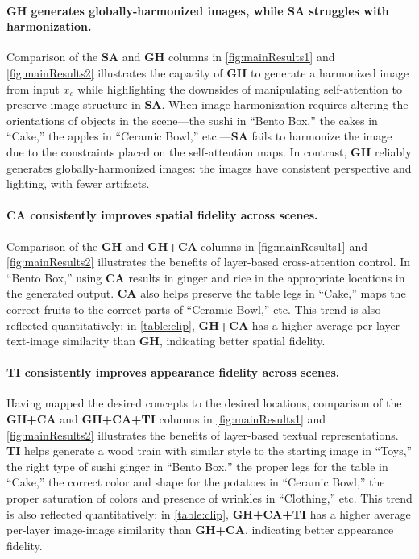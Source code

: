\paragraph{GH generates globally-harmonized images, while SA struggles with harmonization.}
Comparison of the \textbf{SA} and \textbf{GH} columns in \cref{fig:mainResults1} and \ref{fig:mainResults2} illustrates the capacity of \textbf{GH} to generate a harmonized image from input $x_c$ while highlighting the downsides of manipulating self-attention to preserve image structure in \textbf{SA}. When image harmonization requires altering the orientations of objects in the scene---the sushi in ``Bento Box,'' the cakes in ``Cake,'' the apples in ``Ceramic Bowl,'' etc.---\textbf{SA} fails to harmonize the image due to the constraints placed on the self-attention maps. In contrast, \textbf{GH} reliably generates globally-harmonized images: the images have consistent perspective and lighting, with fewer artifacts. 
\vspace{-1em}
\paragraph{CA consistently improves spatial fidelity across scenes.} 
Comparison of the \textbf{GH} and \textbf{GH+CA} columns in \cref{fig:mainResults1} and \ref{fig:mainResults2} illustrates the benefits of layer-based cross-attention control.
In ``Bento Box,'' using \textbf{CA} results in ginger and rice in the appropriate locations in the generated output. \textbf{CA} also helps preserve the table legs in ``Cake,'' maps the correct fruits to the correct parts of ``Ceramic Bowl,'' etc.
This trend is also reflected quantitatively: in \cref{table:clip}, \textbf{GH+CA} has a higher average per-layer text-image similarity than \textbf{GH}, indicating better spatial fidelity. 
\vspace{-1em}
\paragraph{TI consistently improves appearance fidelity across scenes.} Having mapped the desired concepts to the desired locations, comparison of the \textbf{GH+CA} and \textbf{GH+CA+TI} columns in \cref{fig:mainResults1} and \ref{fig:mainResults2} illustrates the benefits of layer-based textual representations. 
\textbf{TI} helps generate a wood train with similar style to the starting image in ``Toys,'' the right type of sushi ginger in ``Bento Box,'' the proper legs for the table in ``Cake,'' the correct color and shape for the potatoes in ``Ceramic Bowl,'' the proper saturation of colors and presence of wrinkles in ``Clothing,'' etc. 
This trend is also reflected quantitatively: in \cref{table:clip}, \textbf{GH+CA+TI} has a higher average per-layer image-image similarity than \textbf{GH+CA}, indicating better appearance fidelity. 
\vspace{-1em}
